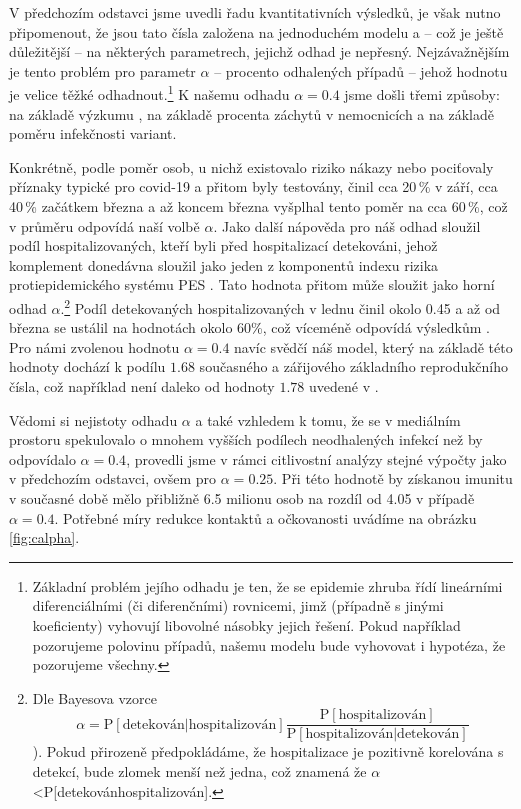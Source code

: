 V předchozím odstavci jsme uvedli řadu kvantitativních výsledků, je
však nutno připomenout, že jsou tato čísla založena na jednoduchém
modelu a -- což je ještě důležitější -- na některých parametrech,
jejichž odhad je nepřesný. Nejzávažnějším je tento problém pro parametr
$\alpha$ -- procento odhalených případů -- jehož hodnotu je velice
těžké odhadnout.\footnote{Základní problém jejího odhadu je ten, že se epidemie zhruba řídí
lineárními diferenciálními (či diferenčními) rovnicemi, jimž (případně
s jinými koeficienty) vyhovují libovolné násobky jejich řešení. Pokud
například pozorujeme polovinu případů, našemu modelu bude vyhovovat
i hypotéza, že pozorujeme všechny.} K našemu odhadu $\alpha=0.4$ jsme došli třemi způsoby: na základě výzkumu
\cite{paqcovid}, na základě procenta záchytů v nemocnicích a na základě poměru infekčnosti
variant. 

Konkrétně, podle \cite{paqcovid} poměr osob, u nichž existovalo riziko
nákazy nebo pociťovaly příznaky typické pro covid-19 a přitom byly testovány,
činil cca 20\,\% v září, cca 40\,\% začátkem března a až koncem března
vyšplhal tento poměr na cca 60\,\%, což v průměru odpovídá naší volbě $\alpha.$
Jako další nápověda pro náš odhad sloužil podíl hospitalizovaných,
kteří byli před hospitalizací detekováni, jehož komplement donedávna sloužil jako
jeden z komponentů indexu rizika protiepidemického systému PES \cite{PES}. Tato hodnota přitom může sloužit jako horní odhad $\alpha$.\footnote{Dle Bayesova vzorce 
\[
\alpha=\mathrm{P}[\text{detekován}|\text{hospitalizován}]\frac{\mathrm{P}[\text{hospitalizován}]}{\mathrm{P}[\text{hospitalizován}|\text{detekován}]}
\]
\cite{Pribylova2021Model}). Pokud přirozeně předpokládáme, že hospitalizace
je pozitivně korelována s detekcí, bude zlomek menší než jedna,
což znamená že $\alpha$\textless P{[}detekován\textbar hospitalizován{]}. } 
Podíl detekovaných hospitalizovaných v lednu činil okolo 0.45 a až od března se ustálil
na hodnotách okolo 60\%, což víceméně odpovídá výsledkům \cite{paqcovid}. 
Pro námi zvolenou hodnotu $\alpha=0.4$ navíc svědčí náš model, který na základě této hodnoty dochází k podílu $1.68$ současného a zářijového základního reprodukčního čísla, což například není daleko od hodnoty $1.78$ uvedené v \cite{curran2021transmission}. 

Vědomi si nejistoty odhadu $\alpha$ a také vzhledem k tomu, že se v mediálním prostoru spekulovalo o mnohem vyšších podílech neodhalených infekcí než by odpovídalo $\alpha=0.4$, provedli
jsme v rámci citlivostní analýzy stejné výpočty jako v předchozím
odstavci, ovšem pro $\alpha=0.25$. Při této hodnotě by získanou
imunitu v současné době mělo přibližně 6.5 milionu osob na rozdíl od 4.05 v
případě $\alpha=0.4$. Potřebné míry redukce kontaktů a očkovanosti uvádíme na obrázku \ref{fig:calpha}.

